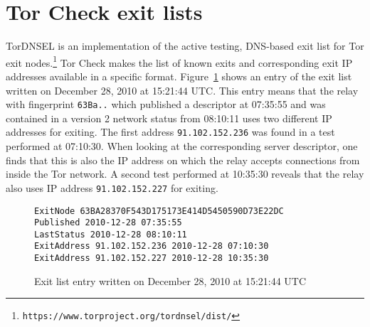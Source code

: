 \documentclass{article}
\begin{document}
\section{Tor Check exit lists}
\label{sec:exitlist}

TorDNSEL is an implementation of the active testing, DNS-based exit list
for Tor exit
nodes.\footnote{\texttt{https://www.torproject.org/tordnsel/dist/}}
Tor Check makes the list of known exits and corresponding exit IP
addresses available in a specific format.
Figure~\ref{fig:exitlist} shows an entry of the exit list written on
December 28, 2010 at 15:21:44 UTC.
This entry means that the relay with fingerprint \verb+63Ba..+ which
published a descriptor at 07:35:55 and was contained in a version 2
network status from 08:10:11 uses two different IP addresses for exiting.
The first address \verb+91.102.152.236+ was found in a test performed at
07:10:30.
When looking at the corresponding server descriptor, one finds that this
is also the IP address on which the relay accepts connections from inside
the Tor network.
A second test performed at 10:35:30 reveals that the relay also uses IP
address \verb+91.102.152.227+ for exiting.

\begin{figure}
\begin{verbatim}
ExitNode 63BA28370F543D175173E414D5450590D73E22DC
Published 2010-12-28 07:35:55
LastStatus 2010-12-28 08:10:11
ExitAddress 91.102.152.236 2010-12-28 07:10:30
ExitAddress 91.102.152.227 2010-12-28 10:35:30
\end{verbatim}
\vspace{-1em}
\caption{Exit list entry written on December 28, 2010 at 15:21:44 UTC}
\label{fig:exitlist}
\end{figure}



\end{document}
